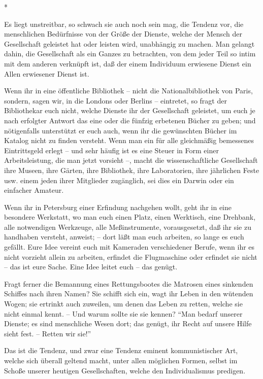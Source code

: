\documentclass{scrbook}
\begin{document}
\begin{center}*\end{center}

Es liegt unstreitbar, so schwach sie auch noch sein mag, die Tendenz vor, die menschlichen Bedürfnisse von der Größe der Dienste, welche der Mensch der Gesellschaft geleistet hat oder leisten wird, unabhängig zu machen. Man gelangt dahin, die Gesellschaft als ein Ganzes zu betrachten, von dem jeder Teil so intim mit dem anderen verknüpft ist, daß der einem Individuum erwiesene Dienst ein Allen erwiesener Dienst ist.

Wenn ihr in eine öffentliche Bibliothek – nicht die Nationalbibliothek von Paris, sondern, sagen wir, in die Londons oder Berlins – eintretet, so fragt der Bibliothekar euch nicht, welche Dienste ihr der Gesellschaft geleistet, um euch je nach erfolgter Antwort das eine oder die fünfzig erbetenen Bücher zu geben; und nötigenfalls unterstützt er euch auch, wenn ihr die gewünschten Bücher im Katalog nicht zu finden versteht. Wenn man ein für alle gleichmäßig bemessenes Eintrittsgeld erlegt – und sehr häufig ist es eine Steuer in Form einer Arbeitsleistung, die man jetzt vorsieht –, macht die wissenschaftliche Gesellschaft ihre Museen, ihre Gärten, ihre Bibliothek, ihre Laboratorien, ihre jährlichen Feste usw. einem jeden ihrer Mitglieder zugänglich, sei dies ein Darwin oder ein einfacher Amateur.

Wenn ihr in Petersburg einer Erfindung nachgehen wollt, geht ihr in eine besondere Werkstatt, wo man euch einen Platz, einen Werktisch, eine Drehbank, alle notwendigen Werkzeuge, alle Meßinstrumente, vorausgesetzt, daß ihr sie zu handhaben versteht, anweist; – dort läßt man euch arbeiten, so lange es euch gefällt. Eure Idee vereint euch mit Kameraden verschiedener Berufe, wenn ihr es nicht vorzieht allein zu arbeiten, erfindet die Flugmaschine oder erfindet sie nicht – das ist eure Sache. Eine Idee leitet euch – das genügt.

Fragt ferner die Bemannung eines Rettungsbootes die Matrosen eines sinkenden Schiffes nach ihren Namen? Sie schifft sich ein, wagt ihr Leben in den wütenden Wogen; sie ertrinkt auch zuweilen, um denen das Leben zu retten, welche sie nicht einmal kennt. – Und warum sollte sie sie kennen? ``Man bedarf unserer Dienste; es sind menschliche Wesen dort; das genügt, ihr Recht auf unsere Hilfe sieht fest. – Retten wir sie!''

Das ist die Tendenz, und zwar eine Tendenz eminent kommunistischer Art, welche sich überall geltend macht, unter allen möglichen Formen, selbst im Schoße unserer heutigen Gesellschaften, welche den Individualismus predigen.
\end{document}
